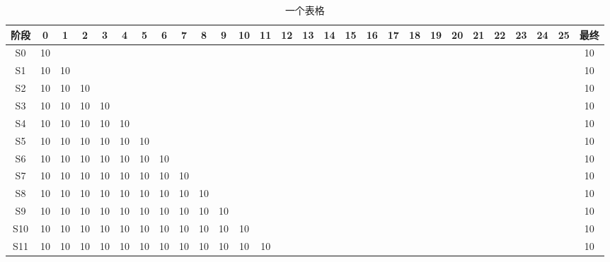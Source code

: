 \begin{landscape}
\begin{table}[t]
    \centering
    \renewcommand\arraystretch{0.85}
    \caption{一个表格}
    \begin{tabular}{c|ccccccccccccccccccccccccccc}
        \toprule[0.15em]
        阶段&0&1&2&3&4&5&6&7&8&9&10&11&12&13&14&15&16&17&18&19&20&21&22&23&24&25&最终\\
        \midrule
        S0  & 10 &    &    &    &    &    &    &    &    &    &    &    &    &    &    &    &    &    &    &    &    &    &    &    &    &    & 10 \\
        S1  & 10 & 10 &    &    &    &    &    &    &    &    &    &    &    &    &    &    &    &    &    &    &    &    &    &    &    &    & 10 \\
        S2  & 10 & 10 & 10 &    &    &    &    &    &    &    &    &    &    &    &    &    &    &    &    &    &    &    &    &    &    &    & 10 \\
        S3  & 10 & 10 & 10 & 10 &    &    &    &    &    &    &    &    &    &    &    &    &    &    &    &    &    &    &    &    &    &    & 10 \\
        S4  & 10 & 10 & 10 & 10 & 10 &    &    &    &    &    &    &    &    &    &    &    &    &    &    &    &    &    &    &    &    &    & 10 \\
        S5  & 10 & 10 & 10 & 10 & 10 & 10 &    &    &    &    &    &    &    &    &    &    &    &    &    &    &    &    &    &    &    &    & 10 \\
        S6  & 10 & 10 & 10 & 10 & 10 & 10 & 10 &    &    &    &    &    &    &    &    &    &    &    &    &    &    &    &    &    &    &    & 10 \\
        S7  & 10 & 10 & 10 & 10 & 10 & 10 & 10 & 10 &    &    &    &    &    &    &    &    &    &    &    &    &    &    &    &    &    &    & 10 \\
        S8  & 10 & 10 & 10 & 10 & 10 & 10 & 10 & 10 & 10 &    &    &    &    &    &    &    &    &    &    &    &    &    &    &    &    &    & 10 \\
        S9  & 10 & 10 & 10 & 10 & 10 & 10 & 10 & 10 & 10 & 10 &    &    &    &    &    &    &    &    &    &    &    &    &    &    &    &    & 10 \\
        S10 & 10 & 10 & 10 & 10 & 10 & 10 & 10 & 10 & 10 & 10 & 10 &    &    &    &    &    &    &    &    &    &    &    &    &    &    &    & 10 \\
        S11 & 10 & 10 & 10 & 10 & 10 & 10 & 10 & 10 & 10 & 10 & 10 & 10 &    &    &    &    &    &    &    &    &    &    &    &    &    &    & 10 \\

\end{tabular}
\end{table}
\end{landscape}

